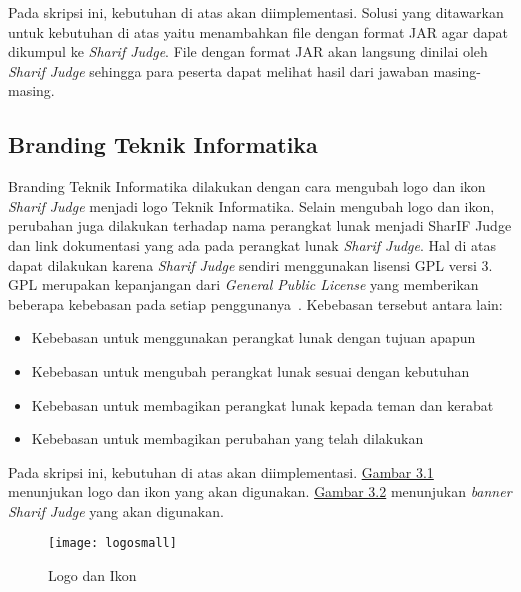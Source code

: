 Pada skripsi ini, kebutuhan di atas akan diimplementasi. %
Solusi yang ditawarkan untuk kebutuhan di atas yaitu menambahkan file dengan format JAR agar dapat dikumpul ke \textit{Sharif Judge}. File dengan format JAR akan langsung dinilai oleh \textit{Sharif Judge} sehingga para peserta dapat melihat hasil dari jawaban masing-masing.

\subsection{Branding Teknik Informatika}
Branding Teknik Informatika dilakukan dengan cara mengubah logo dan ikon \textit{Sharif Judge} menjadi logo Teknik Informatika. Selain mengubah logo dan ikon, perubahan juga dilakukan terhadap nama perangkat lunak menjadi SharIF Judge dan link dokumentasi yang ada pada perangkat lunak \textit{Sharif Judge}. Hal di atas dapat dilakukan karena \textit{Sharif Judge} sendiri menggunakan lisensi GPL versi 3. GPL merupakan kepanjangan dari \textit{General Public License} yang memberikan beberapa kebebasan pada setiap penggunanya~\cite{brett:09:moss}.
Kebebasan tersebut antara lain:
	\begin{itemize}
		\item Kebebasan untuk menggunakan perangkat lunak dengan tujuan apapun \\
		\item Kebebasan untuk mengubah perangkat lunak sesuai dengan kebutuhan \\
		\item Kebebasan untuk membagikan perangkat lunak kepada teman dan kerabat \\
		\item Kebebasan untuk membagikan perubahan yang telah dilakukan
	\end{itemize}
Pada skripsi ini, kebutuhan di atas akan diimplementasi. \hyperref[fig:logosmall]{Gambar 3.1} menunjukan logo dan ikon yang akan digunakan. \hyperref[fig:banner]{Gambar 3.2} menunjukan \textit{banner Sharif Judge} yang akan digunakan.

\begin{figure}[H]
	\centering  
	\texttt{[image: logosmall]}  
	\caption[Logo dan Ikon]{Logo dan Ikon} 
	\label{fig:logosmall} 
\end{figure} 

